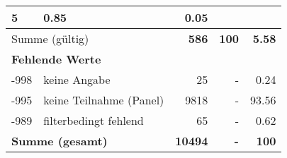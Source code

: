 \begin{longtable}{lXrrr}
       \num{5} &
       \num[round-mode=places,round-precision=2]{0,85} &
         \num[round-mode=places,round-precision=2]{0,05} \\
     \midrule
     \multicolumn{2}{l}{Summe (gültig)} &
       \textbf{\num{586}} &
     \textbf{100} &
       \textbf{\num[round-mode=places,round-precision=2]{5,58}} \\
     \multicolumn{5}{l}{\textbf{Fehlende Werte}}\\
       -998 &
       keine Angabe &
         \num{25} &
        - &
         \num[round-mode=places,round-precision=2]{0,24} \\
       -995 &
       keine Teilnahme (Panel) &
         \num{9818} &
        - &
         \num[round-mode=places,round-precision=2]{93,56} \\
       -989 &
       filterbedingt fehlend &
         \num{65} &
        - &
         \num[round-mode=places,round-precision=2]{0,62} \\
     \midrule
     \multicolumn{2}{l}{\textbf{Summe (gesamt)}} &
          \textbf{\num{10494}} &
        \textbf{-} &
        \textbf{100} \\
     \bottomrule
     \end{longtable}
     
